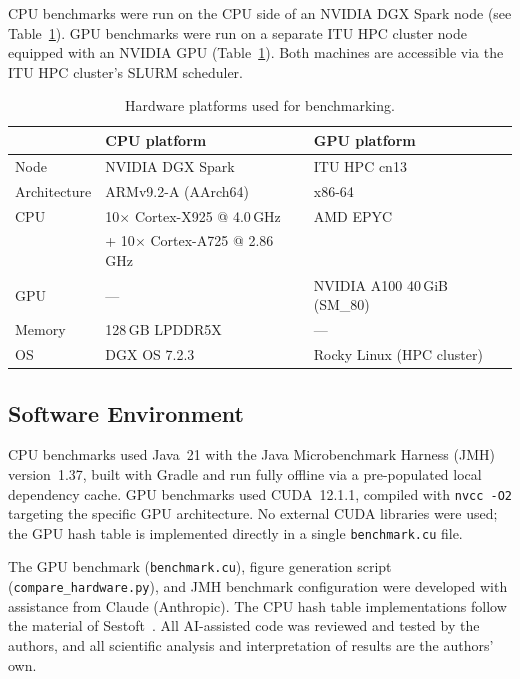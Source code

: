 \documentclass[11pt,a4paper]{article}
\begin{document}
CPU benchmarks were run on the CPU side of an NVIDIA DGX Spark node (see
Table~\ref{tab:hardware}). GPU benchmarks were run on a separate ITU HPC cluster
node equipped with an NVIDIA GPU (Table~\ref{tab:hardware}). Both machines are
accessible via the ITU HPC cluster's SLURM scheduler.

\begin{table}[h]
\centering
\caption{Hardware platforms used for benchmarking.}
\label{tab:hardware}
\begin{tabular}{lll}
\toprule
 & \textbf{CPU platform} & \textbf{GPU platform} \\
\midrule
Node          & NVIDIA DGX Spark       & ITU HPC cn13 \\
Architecture  & ARMv9.2-A (AArch64)    & x86-64 \\
CPU           & 10$\times$ Cortex-X925 @ 4.0\,GHz & AMD EPYC \\
              & + 10$\times$ Cortex-A725 @ 2.86\,GHz & \\
GPU           & ---                    & NVIDIA A100 40\,GiB (SM\_80) \\
Memory        & 128\,GB LPDDR5X        & --- \\
OS            & DGX OS 7.2.3           & Rocky Linux (HPC cluster) \\
\bottomrule
\end{tabular}
\end{table}


\subsection{Software Environment}

CPU benchmarks used Java~21 with the Java Microbenchmark Harness (JMH)
version~1.37, built with Gradle and run fully offline via a pre-populated local
dependency cache. GPU benchmarks used CUDA~12.1.1, compiled with \texttt{nvcc
-O2} targeting the specific GPU architecture. No external CUDA libraries were
used; the GPU hash table is implemented directly in a single
\texttt{benchmark.cu} file.

The GPU benchmark (\texttt{benchmark.cu}), figure generation script (\texttt{compare\_hardware.py}), and JMH benchmark configuration were developed with assistance from Claude (Anthropic). The CPU hash table implementations follow the material of Sestoft~\cite{sestoft2025}. All AI-assisted code was reviewed and tested by the authors, and all scientific analysis and interpretation of results are the authors' own.
\end{document}
